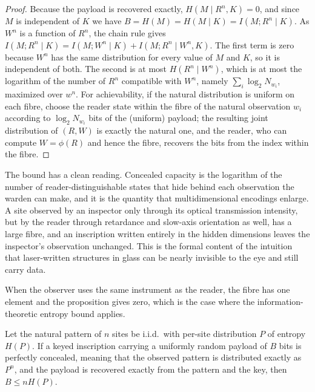 \begin{proof}
Because the payload is recovered exactly, $H(M\mid R^{n},K)=0$, and since $M$ is independent of $K$ we have $B=H(M)=H(M\mid K)=I(M;R^{n}\mid K)$. As $W^{n}$ is a function of $R^{n}$, the chain rule gives $I(M;R^{n}\mid K)=I(M;W^{n}\mid K)+I(M;R^{n}\mid W^{n},K)$. The first term is zero because $W^{n}$ has the same distribution for every value of $M$ and $K$, so it is independent of both. The second is at most $H(R^{n}\mid W^{n})$, which is at most the logarithm of the number of $R^{n}$ compatible with $W^{n}$, namely $\sum_i\log_2N_{w_i}$, maximized over $w^n$. For achievability, if the natural distribution is uniform on each fibre, choose the reader state within the fibre of the natural observation $w_i$ according to $\log_2N_{w_i}$ bits of the (uniform) payload; the resulting joint distribution of $(R,W)$ is exactly the natural one, and the reader, who can compute $W=\phi(R)$ and hence the fibre, recovers the bits from the index within the fibre.
\end{proof}

The bound has a clean reading. Concealed capacity is the logarithm of the number of reader-distinguishable states that hide behind each observation the warden can make, and it is the quantity that multidimensional encodings enlarge. A site observed by an inspector only through its optical transmission intensity, but by the reader through retardance and slow-axis orientation as well, has a large fibre, and an inscription written entirely in the hidden dimensions leaves the inspector's observation unchanged. This is the formal content of the intuition that laser-written structures in glass can be nearly invisible to the eye and still carry data.

When the observer uses the same instrument as the reader, the fibre has one element and the proposition gives zero, which is the case where the information-theoretic entropy bound applies.

\begin{proposition}\label{prop:entropy}
Let the natural pattern of $n$ sites be i.i.d.\ with per-site distribution $P$ of entropy $H(P)$. If a keyed inscription carrying a uniformly random payload of $B$ bits is perfectly concealed, meaning that the observed pattern is distributed exactly as $P^{n}$, and the payload is recovered exactly from the pattern and the key, then $B\le nH(P)$.
\end{proposition}

